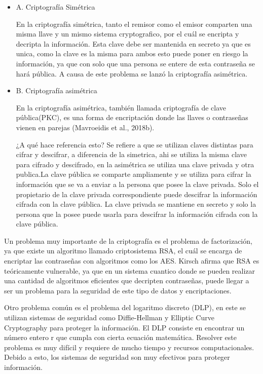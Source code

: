 \documentclass{article}
\begin{document}
\begin{itemize}
    \item{A}. Criptografía Simétrica

        En la criptografía simétrica, tanto el remisor como el emisor comparten una misma llave y un mismo sistema cryptografico, por el cuál se encripta y decripta la información. Esta clave debe ser mantenida en secreto ya que es unica, como la clave es la misma para ambos esto puede poner en riesgo la información, ya que con solo que una persona se entere de esta contraseña se hará pública. A causa de este problema se lanzó la criptografía asimétrica.
    \item{B}. Criptografía asimétrica

        En la criptografía asimétrica, también llamada criptografía de clave pública(PKC), es una forma de encriptación donde las llaves o contraseñas vienen en parejas (Mavroeidis et al., 2018b).

        ¿A qué hace referencia esto? Se refiere a que se utilizan claves distintas para cifrar y descifrar, a diferencia de la simetrica, ahi se utiliza la misma clave para cifrado y descifrado, en la asimétrica se utiliza una clave privada y otra publica.La clave pública se comparte ampliamente y se utiliza para cifrar la información que se va a enviar a la persona que posee la clave privada. Solo el propietario de la clave privada correspondiente puede descifrar la información cifrada con la clave pública. La clave privada se mantiene en secreto y solo la persona que la posee puede usarla para descifrar la información cifrada con la clave pública.

\end{itemize}

Un problema muy importante de la criptografía es el problema de factorización, ya que existe un algoritmo llamado criptosistema RSA, el cuál se encarga de encriptar las contraseñas con algoritmos como los AES. Kirsch afirma que RSA es teóricamente vulnerable, ya que en un sistema cuantico donde se pueden realizar una cantidad de algoritmos eficientes que decripten contraseñas, puede llegar a ser un problema para la seguridad de este tipo de datos y encriptaciones.

Otro problema común es el problema del logaritmo discreto (DLP), en este se utilizan sistemas de seguridad como Diffie-Hellman y Elliptic Curve Cryptography para proteger la información. El DLP consiste en encontrar un número entero r que cumpla con cierta ecuación matemática. Resolver este problema es muy difícil y requiere de mucho tiempo y recursos computacionales. Debido a esto, los sistemas de seguridad son muy efectivos para proteger información.
\end{document}
